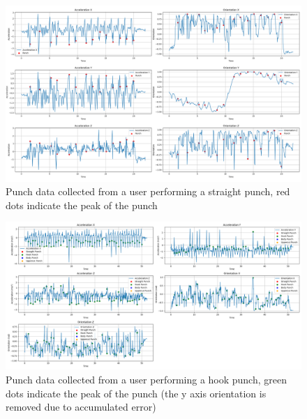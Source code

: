 \documentclass{article}
\begin{document}
    \FloatBarrier
    \begin{figure}[ht]
        \centering
        \includegraphics[width=\textwidth]{straight_user_input.png}
        \caption{Punch data collected from a user performing a straight punch, red
        dots indicate the peak of the punch}
        \label{fig:straight_user_input}
    \end{figure}
    \begin{figure}[ht]
        \centering
        \includegraphics[width=\textwidth]{hook_user_input.png}
        \caption{Punch data collected from a user performing a hook punch, green
        dots indicate the peak of the punch (the y axis orientation is removed
        due to accumulated error)}
        \label{fig:hook_user_input}
    \end{figure}
    \FloatBarrier
\end{document}
